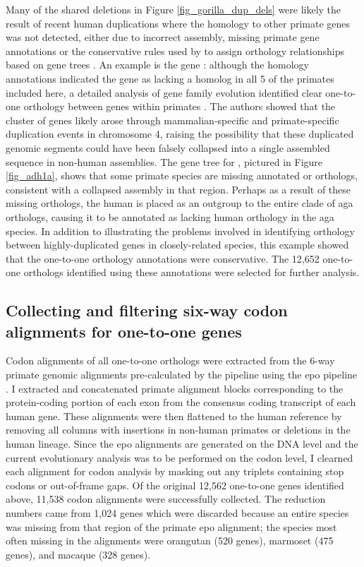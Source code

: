 Many of the shared deletions in Figure \ref{fig_gorilla_dup_dels} were
likely the result of recent human duplications where the homology to
other primate genes was not detected, either due to incorrect
assembly, missing primate gene annotations or the conservative rules
used by \ens to assign orthology relationships based on gene trees
\citep{Vilella2009}. An example is the gene : although the
homology annotations indicated the gene as lacking a homolog in all 5
of the primates included here, a detailed analysis of  gene
family evolution identified clear one-to-one orthology between
 genes within primates \citep{Oota2007}. The authors
showed that the cluster of  genes likely arose through
mammalian-specific and primate-specific duplication events in
chromosome 4, raising the possibility that these duplicated genomic
segments could have been falsely collapsed into a single assembled
sequence in non-human assemblies. The \cmp gene tree for ,
pictured in Figure \ref{fig_adh1a}, shows that some primate species
are missing annotated  or  orthologs,
consistent with a collapsed assembly in that region. Perhaps as a
result of these missing orthologs, the human  is placed as
an outgroup to the entire clade of \ac{aga}  orthologs,
causing it to be annotated as lacking human orthology in the \ac{aga}
species. In addition to illustrating the problems involved in
identifying orthology between highly-duplicated genes in
closely-related species, this example showed that the \ens one-to-one
orthology annotations were conservative. The 12,652 one-to-one
orthologs identified using these annotations were selected for further
analysis.

\subsection{Collecting and filtering six-way codon alignments for one-to-one genes}

Codon alignments of all one-to-one orthologs were extracted from the
6-way primate genomic alignments pre-calculated by the \ens pipeline
using the \ac{epo} pipeline \citep{Paten2008a,Paten2008}. I extracted
and concatenated primate alignment blocks corresponding to the
protein-coding portion of each exon from the consensus coding
transcript of each human gene. These alignments were then flattened to
the human reference by removing all columns with insertions in
non-human primates or deletions in the human lineage. Since the
\ac{epo} alignments are generated on the DNA level and the current
evolutionary analysis was to be performed on the codon level, I
clearned each alignment for codon analysis by masking out any triplets
containing stop codons or out-of-frame gaps. Of the original 12,562
one-to-one genes identified above, 11,538 codon alignments were
successfully collected. The reduction numbers came from 1,024 genes
which were discarded because an entire species was missing from that
region of the primate \ac{epo} alignment; the species most often
missing in the alignments were orangutan (520 genes), marmoset (475 genes),
and macaque (328 genes).

